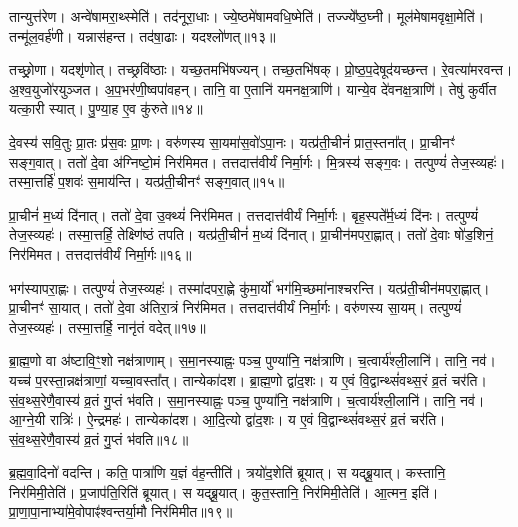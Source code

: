 तान्युत्त॑रेण।
अन्वे॑षामरा॒थ्स्मेति॑।
तद॑नूरा॒धाः।
ज्ये॒ष्ठमे॑षाम\-वधि॒ष्मेति॑।
तज्ज्ये᳚ष्ठ॒घ्नी।
मूल॑मेषामवृक्षा॒मेति॑।
तन्मू॑ल॒वर्\mbox{}ह॑णी।
यन्नास॑हन्त।
तद॑षा॒ढाः।
यदश्लो॑णत्॥१३॥

तच्छ्रो॒णा।
यदशृ॑णोत्।
तच्छ्रवि॑ष्ठाः।
यच्छ॒तमभि॑षज्यन्।
तच्छ॒तभि॑षक्।
प्रो॒ष्ठ॒प॒देषूद॑यच्छन्त।
रे॒वत्या॑मरवन्त।
अ॒श्व॒युजो॑र\-युञ्जत।
अ॒प॒भर॑णी॒ष्वपा॑वहन्।
तानि॒ वा ए॒तानि॑ यमनक्ष॒त्राणि॑।
यान्ये॒व दे॑वनक्ष॒त्राणि॑।
तेषु॑ कुर्वीत यत्का॒री स्यात्।
पु॒ण्या॒ह ए॒व कु॑रुते॥१४॥

दे॒वस्य॑ सवि॒तुः प्रा॒तः प्र॑स॒वः प्रा॒णः।
वरु॑णस्य सा॒यमा॑स॒वो॑\-ऽपा॒नः।
यत्प्र॑ती॒चीनं॑ प्रात॒स्तना᳚त्।
प्रा॒चीनꣳ॑ सङ्ग॒वात्।
ततो॑ दे॒वा अ॑ग्निष्टो॒मं निर॑मिमत।
तत्तदात्त॑वीर्यं निर्मा॒र्गः।
मि॒त्रस्य॑ सङ्ग॒वः।
तत्पुण्यं॑ तेज॒स्व्यहः॑।
तस्मा॒त्तर्\mbox{}हि॑ प॒शवः॑ स॒माय॑न्ति।
यत्प्र॑ती॒चीनꣳ॑ सङ्ग॒वात्॥१५॥

प्रा॒चीनं॑ म॒ध्यं दि॑नात्।
ततो॑ दे॒वा उ॒क्थ्यं॑ निर॑मिमत।
तत्तदात्त॑वीर्यं निर्मा॒र्गः।
बृह॒स्पते᳚र्म॒ध्यं दि॑नः।
तत्पुण्यं॑ तेज॒स्व्यहः॑।
तस्मा॒त्तर्\mbox{}हि॒ तेक्ष्णि॑ष्ठं तपति।
यत्प्र॑ती॒चीनं॑ म॒ध्यं दि॑नात्।
प्रा॒चीन॑\-मपरा॒ह्णात्।
ततो॑ दे॒वाः षो॑ड॒शिनं॒ निर॑मिमत।
तत्तदात्त॑वीर्यं निर्मा॒र्गः॥१६॥

भग॑स्यापरा॒ह्णः।
तत्पुण्यं॑ तेज॒स्व्यहः॑।
तस्मा॑दपरा॒ह्णे कु॑मा॒र्यो॑ भग॑मि॒च्छमा॑नाश्चरन्ति।
यत्प्र॑ती॒चीन॑मपरा॒ह्णात्।
प्रा॒चीनꣳ॑ सा॒यात्।
ततो॑ दे॒वा अ॑तिरा॒त्रं निर॑मिमत।
तत्तदात्त॑वीर्यं निर्मा॒र्गः।
वरु॑णस्य सा॒यम्।
तत्पुण्यं॑ तेज॒स्व्यहः॑।
तस्मा॒त्तर्\mbox{}हि॒ नानृ॑तं वदेत्॥१७॥

ब्रा॒ह्म॒णो वा अ॑ष्टावि॒ꣳ॒शो नक्ष॑त्राणाम्।
स॒मा॒नस्याह्नः॒ पञ्च॒ पुण्या॑नि॒ नक्ष॑त्राणि।
च॒त्वार्य॑श्ली॒लानि॑।
तानि॒ नव॑।
यच्च॑ प॒रस्ता॒न्नक्ष॑त्राणां॒ यच्चा॒वस्ता᳚त्।
तान्येका॑दश।
ब्रा॒ह्म॒णो द्वा॑द॒शः।
य ए॒वं वि॒द्वान्थ्सं॑वथ्स॒रं व्र॒तं चर॑ति।
सं॒व॒थ्स॒रेणै॒वास्य॑ व्र॒तं गु॒प्तं भ॑वति।
स॒मा॒नस्याह्नः॒ पञ्च॒ पुण्या॑नि॒ नक्ष॑त्राणि।
च॒त्वार्य॑श्ली॒लानि॑।
तानि॒ नव॑।
आ॒ग्ने॒यी रात्रिः॑।
ऐ॒न्द्रमहः॑।
तान्येका॑दश।
आ॒दि॒त्यो द्वा॑द॒शः।
य ए॒वं वि॒द्वान्थ्सं॑वथ्स॒रं व्र॒तं चर॑ति।
सं॒व॒थ्स॒रेणै॒वास्य॑ व्र॒तं गु॒प्तं भ॑वति॥१८॥\anuvakamend[स॒ङ्ग॒वाथ्षो॑ड॒शिनं॒ निर॑मिमत॒ तत्तदात्त॑वीर्यं निर्मा॒र्गो व॑देद्भवति समा॒नस्याह्नः॒ पञ्च॒ पुण्या॑नि॒ नक्ष॑त्राण्य॒ष्टौ च॑]

ब्र॒ह्म॒वा॒दिनो॑ वदन्ति।
कति॒ पात्रा॑णि य॒ज्ञं व॑ह॒न्तीति॑।
त्रयो॑द॒शेति॑ ब्रूयात्।
स यद्ब्रू॒यात्।
कस्तानि॒ निर॑मिमी॒तेति॑।
प्र॒जा\-प॑ति॒रिति॑ ब्रूयात्।
स यद्ब्रू॒यात्।
कुत॒स्तानि॒ निर॑मिमी॒तेति॑।
आ॒त्मन॒ इति॑।
प्रा॒णा॒पा॒नाभ्या॑मे॒वोपाꣴ॑\-श्वन्तर्या॒मौ निर॑मिमीत॥१९॥

